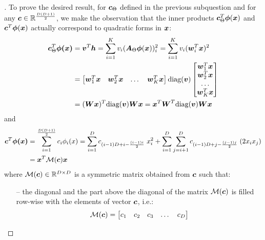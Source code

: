 \begin{questions}
        \question
        \begin{proof}[\unskip\nopunct]
        To prove the desired result, for $\vb*{c}_{\Theta}$ defined in the previous subquestion and for any $\vb*{c} \in \mathbb{R}^{\frac{D(D + 1)}{2}}$, we make the observation that the inner products $\vb*{c}_{\Theta}^T  \vb*{\phi}(\vb*{x})$ and $\vb*{c}^T  \vb*{\phi}(\vb*{x})$ actually correspond to quadratic forms in $\vb*{x}$:
        \begin{align*}
            \vb*{c}_{\Theta}^T \vb*{\phi(x)} &= \vb*{v}^T \vb*{h} = \sum_{i = 1}^K v_i (\vb*{A}_{\Theta} \vb*{\phi}(\vb*{x}))^2_i = 
            \sum_{i = 1}^K v_i (\vb*{w}_i^T \vb*{x})^2 \\
            &= 
            \begin{bmatrix}
                \vb*{w}_1^T \vb*{x} & \vb*{w}_2^T \vb*{x} & \dots & \vb*{w}_K^T \vb*{x}
            \end{bmatrix}
            \text{diag}(\vb*{v})
            \begin{bmatrix}
                \vb*{w}_1^T \vb*{x} \\ \vb*{w}_2^T \vb*{x} \\ \dots \\ \vb*{w}_K^T \vb*{x}
            \end{bmatrix} \\
            &= (\vb*{Wx})^T \text{diag}(\vb*{v}) \vb*{Wx} 
             = \vb*{x}^T \vb*{W}^T \text{diag}(\vb*{v}) \vb*{Wx} 
        \end{align*}
        and 
        \begin{align*}
            \vb*{c}^T \vb*{\phi(x)} &= \sum_{i = 1}^{\frac{D(D + 1)}{2}} c_i \phi_i(x) = \sum_{i = 1}^{D} c_{(i - 1)D + i - \frac{(i - 1)i}{2}}\; x_i^2 + \sum_{i = 1}^{D}\sum_{j = i + 1}^{D} c_{(i - 1)D + j - \frac{(j - 1)j}{2}}\;(2 x_i x_j) \\
            &= \vb*{x}^T \mathcal{M}(\vb*{c}) \vb*{x}
        \end{align*}
        where $\mathcal{M}(\vb*{c}) \in \mathbb{R}^{D \times D}$ is a symmetric matrix obtained from $\vb*{c}$ such that:
        \begin{itemize}
            \item[--] the diagonal and the part above the diagonal of the matrix $\mathcal{M}(\vb*{c})$ is filled row-wise with the elements of vector $\vb*{c}$, i.e.:
            \[
                \mathcal{M}(\vb*{c}) = 
                \begin{bmatrix}
                    c_1 & c_2 & c_3 & \dots & c_D \\

\end{bmatrix}\]
\end{itemize}
\end{proof}
\end{questions}
